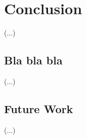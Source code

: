 \chapter{Conclusion} \label{chap:conclusion}

(...)\\

\lipsum[1]

\section{Bla bla bla}

(...)\\

\lipsum[2]

\section{Future Work}

(...)\\

\lipsum[3]
